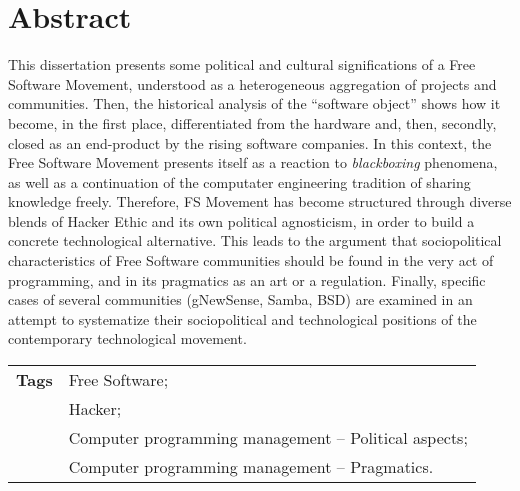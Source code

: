 \chapter*{Abstract}	

This dissertation presents some political and cultural significations of a Free Software Movement, understood as a heterogeneous aggregation of projects and communities. Then, the historical analysis of the “software object” shows how it become, in the first place, differentiated from the hardware and, then, secondly, closed as an end-product by the rising software companies. In this context, the Free Software Movement presents itself as a reaction to \emph{blackboxing} phenomena, as well as a continuation of the computater engineering tradition of sharing knowledge freely. Therefore, FS Movement has become structured through diverse blends of Hacker Ethic and its own political agnosticism, in order to build a concrete technological alternative. This leads to the argument  that sociopolitical characteristics of Free Software communities should be found in the very act of programming, and in its pragmatics as an art or a regulation. Finally, specific cases of several communities (gNewSense, Samba, BSD) are examined in an attempt to systematize their sociopolitical and technological positions of the contemporary technological movement.

\vspace{2cm}

\begin{tabular}{ll}
\textbf{Tags} & Free Software;\\
& Hacker;\\
& Computer programming management – Political aspects;\\
& Computer programming management – Pragmatics.\\
\end{tabular}


